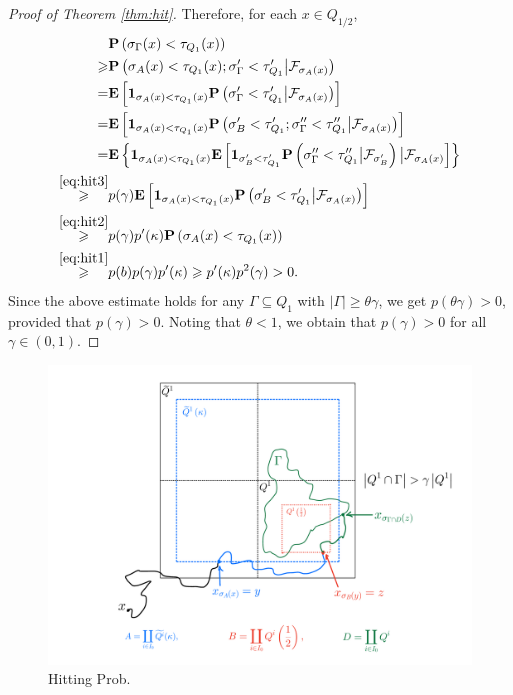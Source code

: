 \documentclass[twoside, 12pt]{book}
\numberwithin{equation}{chapter}
\def\cF{{\mathcal F}}
\def\bE{{\mathbf E}}
\def\bP{{\mathbf P}}
\def\l{\left}
\def\r{\right}
\def\geq{\geqslant}
\def\1{{\mathbf{1}}}
\begin{document}
\begin{proof}[Proof of Theorem \ref{thm:hit}]
		Therefore, for each $x\in Q_{1/2}$, 
		\begin{equation*}
	        \begin{aligned}
	            &\bP\l(\sigma_\Gamma (x)<\tau_{Q_1}(x)\r)\\ 
                \geq& \bP\l({\sigma_A(x)<\tau_{Q_1}(x)}; \sigma'_\Gamma<\tau'_{Q_1} \big| \cF_{\sigma_A(x)}\r)\\ 
                =& \bE\l[ \1_{\sigma_A(x)<\tau_{Q_1}(x)}\bP\l(\sigma'_\Gamma<\tau'_{Q_1}\big|\cF_{\sigma_A(x)}\r)\r]\\
                =& \bE\l[ \1_{\sigma_A(x)<\tau_{Q_1}(x)}\bP\l(\sigma'_B <\tau'_{Q_1};\sigma''_\Gamma<\tau''_{Q_1}\big|\cF_{\sigma_A(x)}\r)\r]\\
                =& \bE\l\{ \1_{\sigma_A(x)<\tau_{Q_1}(x)} \bE\l[ \1_{\sigma'_B <\tau'_{Q_1}}\bP\l(\sigma''_\Gamma<\tau''_{Q_1}\big|\cF_{\sigma'_B}\r)\big|\cF_{\sigma_A(x)}\r]\r\}\\
                \overset{\eqref{eq:hit3}}{\geq}& p(\gamma) \bE\l[ \1_{\sigma_A(x)<\tau_{Q_1}(x)} \bP\l( {\sigma'_B <\tau'_{Q_1}}\big|\cF_{\sigma_A(x)}\r) \r]\\
                \overset{\eqref{eq:hit2}}{\geq} & p(\gamma)p'(\kappa) \bP \l(\sigma_A(x)<\tau_{Q_1}(x)\r) \\
                \overset{\eqref{eq:hit1}}{\geq}& p(b)p(\gamma)p'(\kappa)\geq p'(\kappa)p^2(\gamma)>0. 
			\end{aligned}
		\end{equation*}
		Since the above estimate holds for any $\Gamma\subseteq Q_1$ with $|\Gamma|\geq \theta \gamma$, we get $p(\theta \gamma)>0$, provided that $p(\gamma)>0$. Noting that $\theta<1$, we obtain that $p(\gamma)>0$ for all $\gamma\in (0,1)$. 
	\end{proof}
 
    \begin{figure}
    \centering 
    \includegraphics[width=0.9 \textwidth]{hit prob.pdf} 
    \caption{Hitting Prob.} \label{fig:hit} 
    \end{figure}
	
\end{document}
